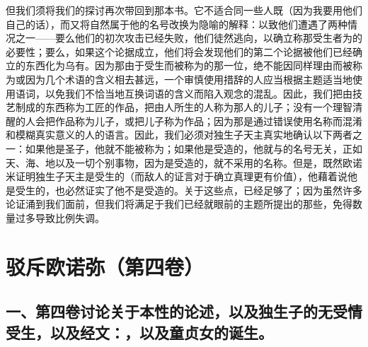 但我们须将我们的探讨再次带回到那本书。它不适合同一些人既（因为我要用他们自己的话），而又将自然属于他的名号改换为隐喻的解释：以致他们遭遇了两种情况之一——要么他们的初次攻击已经失败，他们徒然逃向，以确立称那受生者为的必要性；要么，如果这个论据成立，他们将会发现他们的第二个论据被他们已经确立的东西化为乌有。因为那由于受生而被称为的那一位，绝不能因同样理由而被称为或因为几个术语的含义相去甚远，一个审慎使用措辞的人应当根据主题适当地使用语词，以免我们不恰当地互换词语的含义而陷入观念的混乱。因此，我们把由技艺制成的东西称为工匠的作品，把由人所生的人称为那人的儿子；没有一个理智清醒的人会把作品称为儿子，或把儿子称为作品；因为那是通过错误使用名称而混淆和模糊真实意义的人的语言。因此，我们必须对独生子天主真实地确认以下两者之一：如果他是圣子，他就不能被称为；如果他是受造的，他就与的名号无关，正如天、海、地以及一切个别事物，因为是受造的，就不采用的名称。但是，既然欧诺米证明独生子天主是受生的（而敌人的证言对于确立真理更有价值），他藉着说他是受生的，也必然证实了他不是受造的。关于这些点，已经足够了；因为虽然许多论证涌到我们面前，但我们将满足于我们已经就眼前的主题所提出的那些，免得数量过多导致比例失调。\par



\section{驳斥欧诺弥（第四卷）}


\subsection{一、第四卷讨论关于本性的论述，以及独生子的无受情受生，以及经文：，以及童贞女的诞生。}

